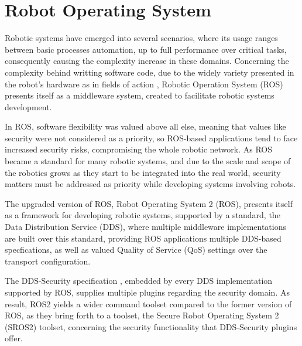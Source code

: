 \chapter{Robot Operating System}\label{c:ros}



Robotic systems have emerged into several scenarios, where its usage ranges between basic processes automation, up to full performance over critical tasks, consequently causing the complexity increase in these domains. Concerning the complexity behind writting software code, due to the widely variety presented in the robot's hardware as in fields of action \cite{cousins2011exponential}, Robotic Operation System (ROS) presents itself as a middleware system, created to facilitate robotic systems development.

In ROS, software flexibility was valued above all else, meaning that values like security were not considered as a priority, so ROS-based applications tend to face increased security risks, compromising the whole robotic network. As ROS became a standard for many robotic systems, and due to the scale and scope of the robotics grows as they start to be integrated into the real world, security matters must be addressed as priority while developing systems involving robots. \cite{diluoffo2018robot, kim2018security}

The upgraded version of ROS, Robot Operating System 2 (ROS), presents itself as a framework for developing robotic systems, supported by a standard, the Data Distribution Service (DDS), where multiple middleware implementations are built over this standard, providing ROS applications multiple DDS-based specfications, as well as valued Quality of Service (QoS) settings over the transport configuration. 

The DDS-Security specification \cite{dds-s}, embedded by every DDS implementation supported by ROS, supplies multiple plugins regarding the security domain. As result, ROS2 yields a wider command toolset compared to the former version of ROS, as they bring forth to a toolset, the Secure Robot Operating System 2 (SROS2) toolset, concerning the security functionality that DDS-Security plugins offer.

